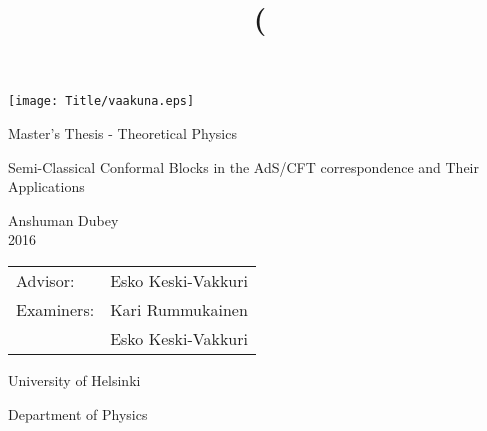 \begin{titlepage}
\setcounter{page}{1}

\begin{center}

\vspace*{3cm}
\texttt{[image: Title/vaakuna.eps]}

\vspace*{2cm}

Master's Thesis - Theoretical Physics \\

\vspace{2.0cm} 
{\Large \bf
  \rule{0pt}{3ex}{Semi-Classical Conformal Blocks in the AdS/CFT correspondence and Their Applications}
}

\title{
 (%
}

\vspace{2.0cm} 
Anshuman Dubey\\
2016

\vspace{1.5cm} 
\begin{tabular}{ll}	Advisor: & 	Esko Keski-Vakkuri \\ 
			Examiners: &	Kari Rummukainen \\
				     &	Esko Keski-Vakkuri
\end{tabular}

\vspace{1.5cm} University of Helsinki

Department of Physics



\end{center}

\end{titlepage}
